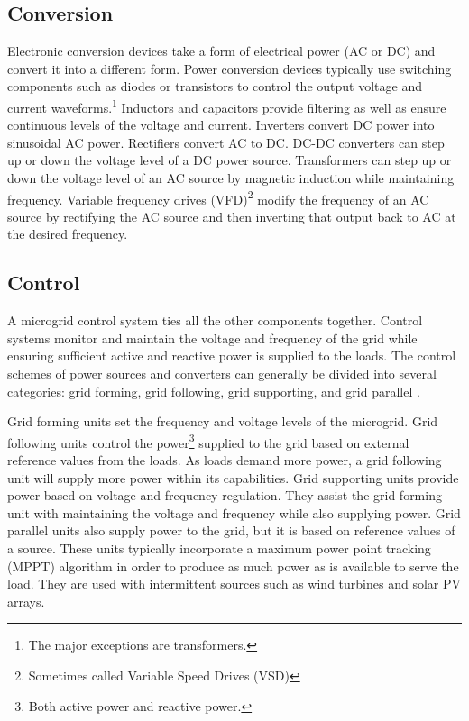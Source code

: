 \subsection{Conversion}
Electronic conversion devices take a form of electrical power (AC or DC) and convert it into a different form. Power conversion devices typically use switching components such as diodes or transistors to control the output voltage and current waveforms.\footnote{The major exceptions are transformers.} Inductors and capacitors provide filtering as well as ensure continuous levels of the voltage and current. Inverters convert DC power into sinusoidal AC power. Rectifiers convert AC to DC. DC-DC converters can step up or down the voltage level of a DC power source. Transformers can step up or down the voltage level of an AC source by magnetic induction while maintaining frequency. Variable frequency drives (VFD)\footnote{Sometimes called Variable Speed Drives (VSD)} modify the frequency of an AC source by rectifying the AC source and then inverting that output back to AC at the desired frequency. 




\subsection{Control}
A microgrid control system ties all the other components together. Control systems monitor and maintain the voltage and frequency of the grid while ensuring sufficient active and reactive power is supplied to the loads. The control schemes of power sources and converters can generally be divided into several categories: grid forming, grid following, grid supporting, and grid parallel \cite{Ortjohann2012, Engler, Strauss2003}. 

Grid forming units set the frequency and voltage levels of the microgrid. Grid following units control the power\footnote{Both active power and reactive power.} supplied to the grid based on external reference values from the loads. As loads demand more power, a grid following unit will supply more power within its capabilities. Grid supporting units provide power based on voltage and frequency regulation. They assist the grid forming unit with maintaining the voltage and frequency while also supplying power. Grid parallel units also supply power to the grid, but it is based on reference values of a source. These units typically incorporate a maximum power point tracking (MPPT) algorithm in order to produce as much power as is available to serve the load. They are used with intermittent sources such as wind turbines and solar PV arrays. 

